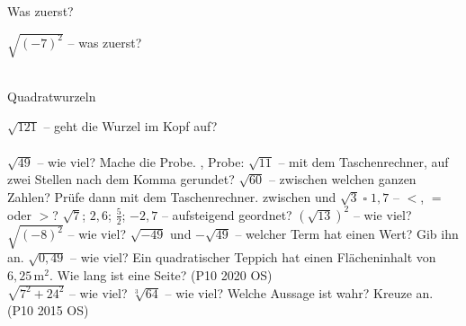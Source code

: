 \setcounter{aufgabe}{20}

\begin{aufgabe}{Was zuerst?}
\begin{teile}
\teil $\sqrt{(-7)^2}$ – was zuerst?\\  \\ 
\end{teile}
\end{aufgabe}

\begin{aufgabe}{Quadratwurzeln}
\begin{teile}
\teil $\sqrt{121}$ – geht die Wurzel im Kopf auf?\\  \\ 
\teil $\sqrt{49}$ – wie viel? Mache die Probe. \leerfeld , Probe: \leerfeld
\teil $\sqrt{11}$ – mit dem Taschenrechner, auf zwei Stellen nach dem Komma gerundet? \leerfeld
\teil $\sqrt{60}$ – zwischen welchen ganzen Zahlen? Prüfe dann mit dem Taschenrechner. zwischen \leerfeld und \leerfeld
\teil $\sqrt{3} \;\square\; 1{,}7$ – $<$, $=$ oder $>$?
\teil $\sqrt{7}$; $2{,}6$; $\frac{5}{2}$; $-2{,}7$ – aufsteigend geordnet?
\teil $\left(\sqrt{13}\right)^2$ – wie viel? \leerfeld
\teil $\sqrt{(-8)^2}$ – wie viel? \leerfeld
\teil $\sqrt{-49}$ und $-\sqrt{49}$ – welcher Term hat einen Wert? Gib ihn an. \leerfeld
\teil $\sqrt{0{,}49}$ – wie viel? \leerfeld
\teil Ein quadratischer Teppich hat einen Flächeninhalt von $6{,}25\,\text{m}^2$. Wie lang ist eine Seite? \hfill (P10 2020 OS) \\ \leerfeld[m]
\teil $\sqrt{7^2 + 24^2}$ – wie viel? \leerfeld
\teil $\sqrt[3]{64}$ – wie viel? \leerfeld
\teil Welche Aussage ist wahr? Kreuze an. \hfill (P10 2015 OS)\\  \\  \\ 
\end{teile}
\end{aufgabe}

